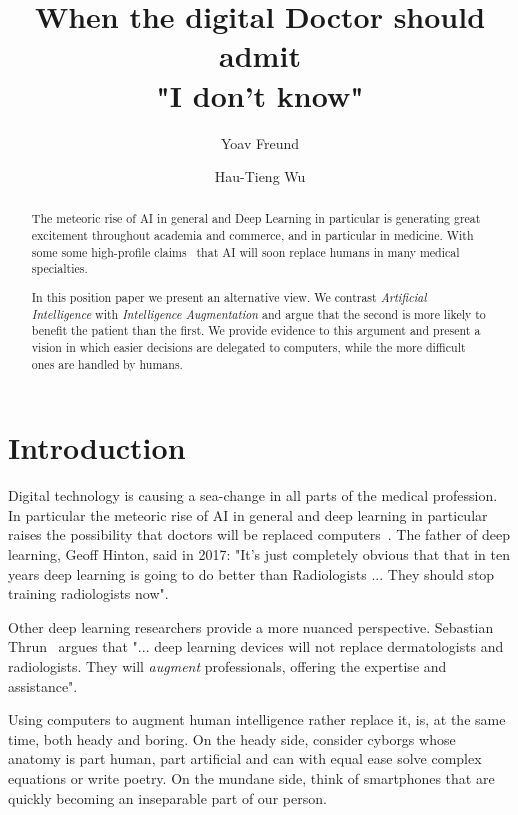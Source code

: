 \documentclass[10pt]{article}
\title{When the digital Doctor should admit\\ "I don't know"}
\author{Yoav Freund \and Hau-Tieng Wu}
\begin{document}
\maketitle

\begin{abstract}

  The meteoric rise of AI in general and Deep Learning in particular
  is generating great excitement throughout academia and commerce, and
  in particular in medicine\cite{topol2019deep,
    wachter2015digital}. With some some high-profile claims~\cite{}
  that AI will soon replace humans in many medical specialties.

  In this position paper we present an alternative view. We contrast
  {\em Artificial Intelligence} with {\em Intelligence Augmentation}
  and argue that the second is more likely to benefit the patient than
  the first. We provide evidence to this argument and present a vision
  in which easier decisions are delegated to computers, while the more
  difficult ones are handled by humans.

\end{abstract}


\section*{Introduction}

Digital technology is causing a sea-change in all parts of the medical
profession. In particular the meteoric rise of AI in general and deep
learning in particular raises the possibility that doctors will be
replaced computers~\cite{Mukherjee2017}. The father of deep learning,
Geoff Hinton, said in 2017: "It's just completely obvious that that in
ten years deep learning is going to do better than Radiologists
... They should stop training radiologists now".

Other deep learning researchers provide a more nuanced
perspective. Sebastian
Thrun~\cite{Mukherjee2017,esteva2017dermatologist} argues that
"... deep learning devices will not replace dermatologists and
radiologists. They will {\em augment} professionals, offering the
expertise and assistance".

Using computers to augment human intelligence rather replace it, is,
at the same time, both heady and boring. On the heady side, consider
cyborgs whose anatomy is part human, part artificial and can with
equal ease solve complex equations or write poetry. On the mundane
side, think of smartphones that are quickly becoming an inseparable
part of our person.
 
\end{document}

